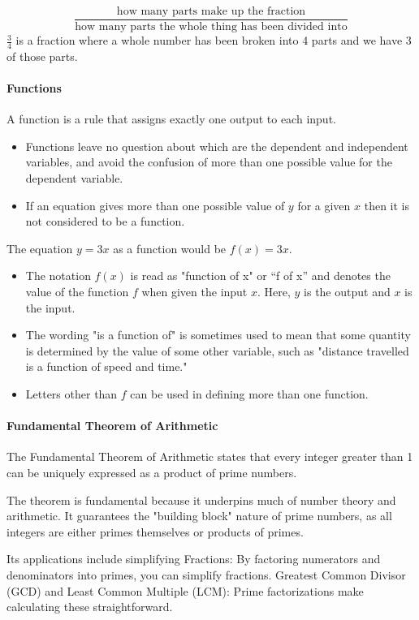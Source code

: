 \documentclass[12pt]{article}
\begin{document}
$$\frac{\textrm{how many parts make up the fraction}}{\textrm{how many parts the whole thing has been divided into}}$$
$\frac{3}{4}$ is a fraction where a whole number has been broken into 4 parts and we have 3 of those parts.

\paragraph{Functions}
A function is a rule that assigns exactly one output to each input.

\begin{itemize}
\item Functions leave no question about which are the dependent and independent variables, and avoid the confusion of more than one possible value for the dependent variable.
\item If an equation gives more than one possible value of \( y \) for a given \( x \) then it is not considered to be a function.
\end{itemize}

The equation $y=3x$ as a function would be $f(x)=3x$.
\begin{itemize}
\item The notation $f(x)$ is read as "function of x" or “f of x” and denotes the value of the function $f$ when given the input $x$. Here, \( y \) is the output and \( x \) is the input.
\item The wording "is a function of" is sometimes used to mean that some quantity is determined by the value of some other variable, such as "distance travelled is a function of speed and time."
\item Letters other than $f$ can be used in defining more than one function.
\end{itemize}

\paragraph{Fundamental Theorem of Arithmetic}
The Fundamental Theorem of Arithmetic states that every integer greater than 1 can be uniquely expressed as a product of prime numbers.

The theorem is fundamental because it underpins much of number theory and arithmetic. It guarantees the "building block" nature of prime numbers, as all integers are either primes themselves or products of primes.

Its applications include simplifying Fractions: By factoring numerators and denominators into primes, you can simplify fractions.
Greatest Common Divisor (GCD) and Least Common Multiple (LCM): Prime factorizations make calculating these straightforward.
\end{document}
